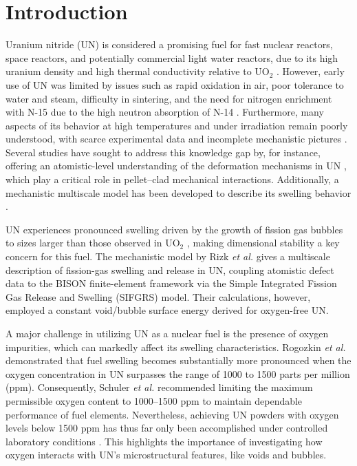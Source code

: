\documentclass[preprint,12pt,sort&compress]{elsarticle}
\newcommand{\?}{\stackrel{?}{=}}
\providecommand{\DIFaddtex}[1]{{\bf #1}} %
\providecommand{\DIFdeltex}[1]{} %
\providecommand{\DIFaddbegin}{\protect\color{blue}} %
\providecommand{\DIFaddend}{\protect\color{black}} %
\providecommand{\DIFdelbegin}{\protect\color{red}} %
\providecommand{\DIFdelend}{\protect\color{black}} %
\providecommand{\DIFadd}[1]{\texorpdfstring{\DIFaddtex{#1}}{#1}} %
\providecommand{\DIFdel}[1]{\texorpdfstring{\DIFdeltex{#1}}{}} %
\newcommand{\DIFscaledelfig}{0.5}
\newlength{\DIFdelgraphicswidth} %
\newlength{\DIFdelgraphicsheight} %
\newcommand{\DIFaddincludegraphics}[2][]{{\color{blue}\fbox{\DIFOincludegraphics[#1]{#2}}}} %
\newcommand{\DIFdelincludegraphics}[2][]{%
\sbox{\DIFdelgraphicsbox}{\DIFOincludegraphics[#1]{#2}}%
\settoboxwidth{\DIFdelgraphicswidth}{\DIFdelgraphicsbox} %
\settoboxtotalheight{\DIFdelgraphicsheight}{\DIFdelgraphicsbox} %
\scalebox{\DIFscaledelfig}{%
\parbox[b]{\DIFdelgraphicswidth}{\usebox{\DIFdelgraphicsbox}\\[-\baselineskip] \rule{\DIFdelgraphicswidth}{0em}}\llap{\resizebox{\DIFdelgraphicswidth}{\DIFdelgraphicsheight}{%
\setlength{\unitlength}{\DIFdelgraphicswidth}%
\begin{picture}(1,1)%
\thicklines\linethickness{2pt} %
{\color[rgb]{1,0,0}\put(0,0){\framebox(1,1){}}}%
{\color[rgb]{1,0,0}\put(0,0){\line( 1,1){1}}}%
{\color[rgb]{1,0,0}\put(0,1){\line(1,-1){1}}}%
\end{picture}%
}\hspace*{3pt}}} %
} %
\DeclareRobustCommand{\DIFaddbegin}{\DIFOaddbegin \let\includegraphics\DIFaddincludegraphics} %
\DeclareRobustCommand{\DIFaddend}{\DIFOaddend \let\includegraphics\DIFOincludegraphics} %
\DeclareRobustCommand{\DIFdelbegin}{\DIFOdelbegin \let\includegraphics\DIFdelincludegraphics} %
\DeclareRobustCommand{\DIFdelend}{\DIFOaddend \let\includegraphics\DIFOincludegraphics} %
\begin{document}
\newpage

\linenumbers

\section{Introduction}
\label{intro}

Uranium nitride (UN) is considered a \DIFdelbegin \DIFdel{highly }\DIFdelend promising fuel for fast nuclear reactors, space reactors, and potentially commercial light water reactors, due to its high uranium density and high thermal conductivity relative to UO$_2$ \cite{Wallenius2020, Uno2020}. However, early use of UN was limited by issues such as rapid oxidation in air, poor tolerance to water and steam, difficulty in sintering, and the need for nitrogen enrichment with N-15 due to the high neutron absorption of N-14 \cite{Wallenius2020, Uno2020}. Furthermore, many aspects of its behavior at high temperatures and under irradiation remain poorly understood, with scarce experimental data and incomplete mechanistic pictures \cite{Wallenius2020, Uno2020}. Several studies have sought to address this knowledge gap by, for instance, offering an atomistic-level understanding of the deformation mechanisms in UN \DIFdelbegin \DIFdel{\cite{AbdulHameed2024b, AbdulHameed2024c}}\DIFdelend \DIFaddbegin \DIFadd{\cite{AbdulHameed2024b, AbdulHameed2025}}\DIFaddend , which play a critical role in pellet–clad mechanical interactions. Additionally, a mechanistic multiscale model has been developed to describe its swelling behavior \cite{Rizk2025}.

UN experiences pronounced swelling driven by the growth of fission gas bubbles to sizes larger than those observed in UO$_2$ \cite{Ronchi1975, Ronchi1978, Rizk2025}, making dimensional stability a key concern for this fuel. The mechanistic model by Rizk \textit{et al.} \cite{Rizk2025} gives a multiscale description of fission-gas swelling and release in UN, coupling atomistic defect data to the BISON finite-element framework via the Simple Integrated Fission Gas Release and Swelling (SIFGRS) model. Their calculations, however, employed a constant void/bubble surface energy derived for oxygen-free UN.

A major challenge in utilizing UN as a nuclear fuel is the presence of oxygen impurities, which can markedly affect its swelling characteristics. Rogozkin \textit{et al.} \cite{Rogozkin2003} demonstrated that fuel swelling becomes substantially more pronounced when the oxygen concentration in UN surpasses the range of 1000 to 1500 parts per million (ppm). Consequently, Schuler \textit{et al.} \cite{Schuler2017} recommended limiting the maximum permissible oxygen content to 1000--1500 ppm to maintain dependable performance of fuel elements. Nevertheless, achieving UN powders with oxygen levels below 1500 ppm has thus far only been accomplished under controlled laboratory conditions \cite{Schuler2017}. This highlights the importance of investigating how oxygen interacts with UN's microstructural features, like voids and bubbles. 
\end{document}
